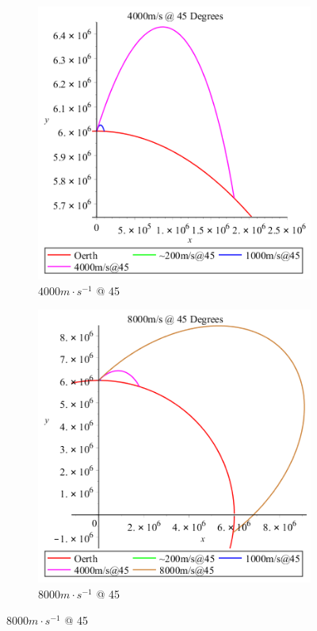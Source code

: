 \documentclass[12pt]{extarticle}
\begin{document}
\begin{figure}[h!]
	\caption{Launching at Larger Velocities}
	\begin{subfigure}{0.50\textwidth}
		\includegraphics[scale=0.55]{Third.png}
		\caption{$4000m\cdot s^{-1}$ @ 45}
		\label{fig:img3}
	\end{subfigure}
	\begin{subfigure}{0.50\textwidth}
		\includegraphics[scale=0.55]{Fourth.png}
		\caption{$8000m\cdot s^{-1}$ @ 45}
		\label{fig:img4}
	\end{subfigure}
\end{figure}
\end{document}
